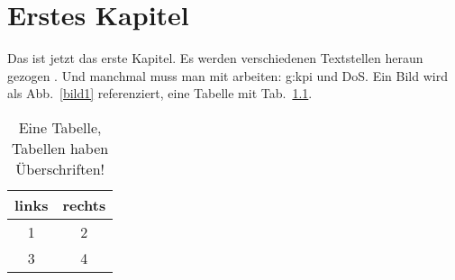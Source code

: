\chapter{Erstes Kapitel}

Das ist jetzt das erste Kapitel. Es werden verschiedenen Textstellen
heraun gezogen \cite{3gpp,Ell08,aks93}. Und manchmal muss man mit
 arbeiten: \gls{g:kpi} und \gls{DoS}. Ein Bild wird als
Abb.~\ref{bild1} referenziert, eine Tabelle mit Tab.~\ref{tab:tabelle}.

\begin{table}
  \centering
  \caption{Eine Tabelle, Tabellen haben Überschriften!}
  \label{tab:tabelle}
  \begin{tabular}{|c|c|}
    links & rechts \\ \hline
    1 & 2 \\
    3 & 4 \\
  \end{tabular}
\end{table}

\blindtext[4]



